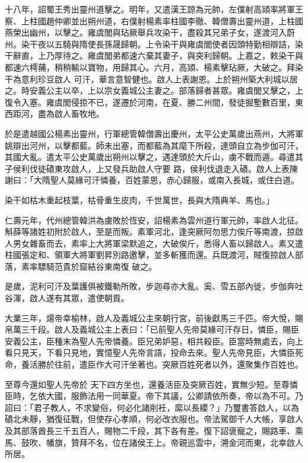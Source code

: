 \begin{pinyinscope}
 十八年，詔蜀王秀出靈州道擊之。明年，又遣漢王諒為元帥，左僕射高熲率將軍王察、上柱國趙仲卿並出朔州道，右僕射楊素率柱國李徹、韓僧壽出靈州道，上柱國燕榮出幽州，以擊之。雍虞閭與玷厥舉兵攻染干，盡殺其兄弟子女，遂渡河入蔚州。染干夜以五騎與隋使長孫晟歸朝。上令染干與雍虞閭使者因頭特勤相辯詰，染干辭直，上乃厚待之。雍虞閭弟都速六棄其妻子，與突利歸朝。上嘉之，敕染干與都速六樗蒱，稍稍輸以寶物，用歸其心。六月，高熲、楊素擊玷厥，大破之。拜染干為意利珍豆啟人
 可汗，華言意智健也。啟人上表謝恩。上於朔州築大利城以居之。時安義公主以卒，上以宗女義城公主妻之。部落歸者甚眾。雍虞閭又擊之，上復令入塞。雍虞閭侵掠不已，遂遷於河南，在夏、勝二州間，發徒掘塹數百里，東西距河，盡為啟人畜牧地。



 於是遣越國公楊素出靈州，行軍總管韓僧壽出慶州，太平公史萬歲出燕州，大將軍姚辯出河州，以擊都藍。師未出塞，而都藍為其麾下所殺，達頭自立為步伽可汗，其國大亂。遣太平公史萬歲出朔州以擊之，遇達頭於大斤山，虜不戰而遁。尋遣其子侯利伐徒磧東攻啟人，上又發兵助啟人守要
 路，侯利伐退走入磧。啟人上表陳謝曰：「大隋聖人莫緣可汗憐養，百姓蒙恩，赤心歸服，或南入長城，或住白道。



 染干如枯木重起枝葉，枯骨重生皮肉，千世萬世，長與大隋典羊、馬也。」



 仁壽元年，代州總管韓洪為虜敗於恆安，詔楊素為雲州道行軍元帥，率啟人北征。斛薛等諸姓初附於啟人，至是而叛。素軍河北，逢突厥阿勿思力俟斤等南渡，掠啟人男女雜畜而去，素率上大將軍梁默追之，大破俟斤，悉得人畜以歸啟人。素又遣柱國張定和、領軍大將軍劉昇別路邀擊，並多斬獲而還。兵既渡河，賊復掠啟人部落，素率驃騎范貴於窟結谷東南復
 破之。



 是歲，泥利可汗及葉護俱被鐵勒所敗，步迦尋亦大亂。奚、雪五部內徙，步伽奔吐谷渾，啟人遂有其眾，遣使朝貢。



 大業三年，煬帝幸榆林，啟人及義城公主來朝行宮，前後獻馬三千匹。帝大悅，賜帛萬三千段。啟人及義城公主上表曰：「已前聖人先帝莫緣可汗存日，憐臣，賜臣安義公主，臣種末為聖人先帝憐養。臣兄弟妒惡，相共殺臣。臣當時無處去，向上看只見天，下看只見地，實憶聖人先帝言語，投命去來。聖人先帝見臣，大憐臣死命，養活勝於往前，遣臣作大可汗坐著也。突厥百姓死者以外，還聚集作百姓也。



 至尊今還如聖人先帝於
 天下四方坐也，還養活臣及突厥百姓，實無少短。至尊憐臣時，乞依大國，服飾法用一同華夏。帝下其議，公卿請依所奏，帝以為不可。乃詔曰：「君子教人，不求變俗，何必化諸削衽，縻以長纓？」乃璽書答啟人，以為磧北未靜，猶復征戰，但使存心孝順，何必改衣服也。帝法駕御千人大帳，享啟人及其部落酋長三千五百人，賜物二千段，其下各有差。復下詔褒寵之，賜路車、乘馬、鼓吹、幡旗，贊拜不名，位在諸侯王上。帝親巡雲中，溯金河而東，北幸啟人所居。




\end{pinyinscope}

